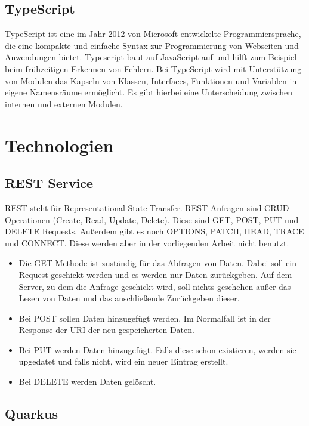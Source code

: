 \subsection{TypeScript}
TypeScript ist eine im Jahr 2012 von Microsoft entwickelte Programmiersprache, die eine kompakte und einfache Syntax zur Programmierung von Webseiten und Anwendungen bietet.
Typescript baut auf JavaScript auf und hilft zum Beispiel beim frühzeitigen Erkennen von Fehlern.
Bei TypeScript wird mit Unterstützung von Modulen das Kapseln von Klassen, Interfaces, Funktionen und Variablen in eigene Namensräume ermöglicht.
Es gibt hierbei eine Unterscheidung zwischen internen und externen Modulen.

\section{Technologien}

\subsection{REST Service}

REST steht für Representational State Transfer.
REST Anfragen sind CRUD – Operationen (Create, Read, Update, Delete).
Diese sind GET, POST, PUT und DELETE Requests.
Außerdem gibt es noch OPTIONS, PATCH, HEAD, TRACE und CONNECT\@.
Diese werden aber in der vorliegenden Arbeit nicht benutzt.

\begin{itemize}
    \item Die GET Methode ist zuständig für das Abfragen von Daten.
    Dabei soll ein Request geschickt werden und es werden nur Daten zurückgeben.
    Auf dem Server, zu dem die Anfrage geschickt wird, soll nichts geschehen außer das Lesen von Daten und das anschließende Zurückgeben dieser.
    \item Bei POST sollen Daten hinzugefügt werden.
    Im Normalfall ist in der Response der URI der neu gespeicherten Daten.
    \item Bei PUT werden Daten hinzugefügt.
    Falls diese schon existieren, werden sie upgedatet und falls nicht, wird ein neuer Eintrag erstellt.
    \item Bei DELETE werden Daten gelöscht.
\end{itemize}

\subsection{Quarkus}\label{quarkus}

